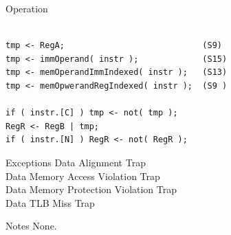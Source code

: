 \begin{iPageDescOpEntry}{Operation}
\begin{lstlisting}[style=iPageOpStyle]

tmp <- RegA;                            (S9)
tmp <- immOperand( instr );             (S15)
tmp <- memOperandImmIndexed( instr );   (S13)
tmp <- memOpwerandRegIndexed( instr );  (S9 )

if ( instr.[C] ) tmp <- not( tmp );
RegR <- RegB | tmp;
if ( instr.[N] ) RegR <- not( RegR );
\end{lstlisting}
\end{iPageDescOpEntry}

\begin{iPageDescEntry}{Exceptions}
  Data Alignment Trap\\
  Data Memory Access Violation Trap\\
  Data Memory Protection Violation Trap\\
  Data TLB Miss Trap
\end{iPageDescEntry}

\begin{iPageDescEntry}{Notes}
  None. 
\end{iPageDescEntry}